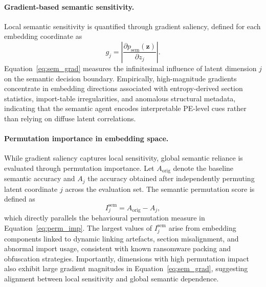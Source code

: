 \documentclass[lettersize,journal]{IEEEtran}
\begin{document}
\vspace{0.3em}
\paragraph{Gradient-based semantic sensitivity.}
Local semantic sensitivity is quantified through gradient saliency, defined for each
embedding coordinate as
\begin{equation}
g_j =
\left|
\frac{\partial p_{\mathrm{sem}}(\mathbf{z})}{\partial z_j}
\right|.
\label{eq:sem_grad}
\end{equation}
Equation~\eqref{eq:sem_grad} measures the infinitesimal influence of latent dimension $j$
on the semantic decision boundary.
Empirically, high-magnitude gradients concentrate in embedding directions associated
with entropy-derived section statistics, import-table irregularities, and anomalous
structural metadata, indicating that the semantic agent encodes interpretable PE-level cues
rather than relying on diffuse latent correlations.

\vspace{0.3em}
\paragraph{Permutation importance in embedding space.}
While gradient saliency captures local sensitivity, global semantic reliance is evaluated through permutation importance.
Let $A_{\mathrm{orig}}$ denote the baseline semantic accuracy and $A_j$ the accuracy obtained after independently permuting latent coordinate $j$ across the evaluation set. The semantic permutation score is defined as
\begin{equation}
I^{\mathrm{sem}}_j = A_{\mathrm{orig}} - A_j,
\label{eq:sem_perm}
\end{equation}
which directly parallels the behavioural permutation measure in Equation~\eqref{eq:perm_imp}.
The largest values of $I^{\mathrm{sem}}_j$ arise from embedding components linked to dynamic linking artefacts, section misalignment, and abnormal import usage, consistent with known ransomware packing and obfuscation strategies. Importantly, dimensions with high permutation impact also exhibit large gradient magnitudes in Equation~\eqref{eq:sem_grad}, suggesting alignment between local sensitivity and global semantic dependence.

\vspace{0.3em}
\end{document}
